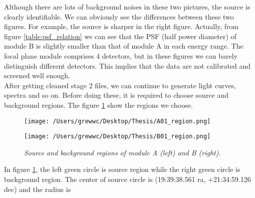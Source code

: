 \documentclass[12pt]{report}
\newcommand{\mycaption}[1]{\caption{\textit{\footnotesize #1}}}
\begin{document}
        Although there are lots of background noises in these two pictures, the source is clearly identifiable. 
        We can obviously see the differences between these two figures. For example, the source is sharper in the 
        right figure. Actually, from figure \ref{table:psf_relation} we can see that the PSF (half power diameter) of
        module B is slightly smaller than that of module A in each energy range. 
        The focal plane module comprises 4 detectors, but in these figures we can barely distinguish different 
        detectors. This implies that the data are not calibrated and screened well enough. \\
        \indent After getting cleaned stage 2 files, we can continue to generate light curves, spectra and so on. 
        Before doing these, it is required to choose source and background regions. The figure \ref{fig:sky0}
        show the regions we choose.  \\
        \begin{figure}[h]
          \begin{minipage}{0.45\textwidth} 
            \begin{flushright} 
            \texttt{[image: /Users/grewwc/Desktop/Thesis/A01\_region.png]}
            \end{flushright}
          \end{minipage}
          \hspace{2.1cm}  
          \begin{minipage}{0.45\textwidth}
            \begin{flushleft}
            \texttt{[image: /Users/grewwc/Desktop/Thesis/B01\_region.png]}
            \end{flushleft}
          \end{minipage}
          \begin{center}
          \begin{minipage}{0.85\textwidth}
            \vspace{0.25cm}
            \mycaption{Source and background regions of module A (left) and B (right).}
            \label{fig:sky0}
          \end{minipage}
        \end{center}
        \end{figure}
        \indent In figure \ref{fig:sky0}, the left green circle is source region while the right green 
        circle is 
        background region. The center of source circle is (19:39:38.561 ra, +21:34:59.126 dec) and the radius is 
\end{document}
